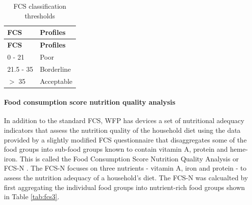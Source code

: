 \documentclass[12pt,a4paper]{article}
\let\oldparagraph\paragraph
\renewcommand{\paragraph}[1]{\oldparagraph{#1}\mbox{}}
\begin{document}
\begin{longtable}[]{@{}ll@{}}
\caption{\label{tab:fcsThresholds} FCS classification thresholds}\tabularnewline
\toprule
\begin{minipage}[b]{0.16\columnwidth}\raggedright
\textbf{FCS}\strut
\end{minipage} & \begin{minipage}[b]{0.20\columnwidth}\raggedright
\textbf{Profiles}\strut
\end{minipage}\tabularnewline
\midrule
\endfirsthead
\toprule
\begin{minipage}[b]{0.16\columnwidth}\raggedright
\textbf{FCS}\strut
\end{minipage} & \begin{minipage}[b]{0.20\columnwidth}\raggedright
\textbf{Profiles}\strut
\end{minipage}\tabularnewline
\midrule
\endhead
\begin{minipage}[t]{0.16\columnwidth}\raggedright
0 - 21\strut
\end{minipage} & \begin{minipage}[t]{0.20\columnwidth}\raggedright
Poor\strut
\end{minipage}\tabularnewline
\begin{minipage}[t]{0.16\columnwidth}\raggedright
21.5 - 35\strut
\end{minipage} & \begin{minipage}[t]{0.20\columnwidth}\raggedright
Borderline\strut
\end{minipage}\tabularnewline
\begin{minipage}[t]{0.16\columnwidth}\raggedright
\(>\) 35\strut
\end{minipage} & \begin{minipage}[t]{0.20\columnwidth}\raggedright
Acceptable\strut
\end{minipage}\tabularnewline
\bottomrule
\end{longtable}

\hypertarget{fcsn}{%
\paragraph{Food consumption score nutrition quality analysis}\label{fcsn}}

In addition to the standard FCS, WFP has devices a set of nutritional adequacy indicators that assess the nutrition quality of the household diet using the data provided by a slightly modified FCS questionnaire that disaggregates some of the food groups into sub-food groups known to contain vitamin A, protein and heme-iron. This is called the Food Consumption Score Nutrition Quality Analysis or FCS-N \citep{WorldFoodProgramme:2015tn}. The FCS-N focuses on three nutrients - vitamin A, iron and protein - to assess the nutrition adequacy of a household's diet. The FCS-N was calcualted by first aggregating the individual food groups into nutrient-rich food groups shown in Table \ref{tab:fcs3}.
\end{document}
